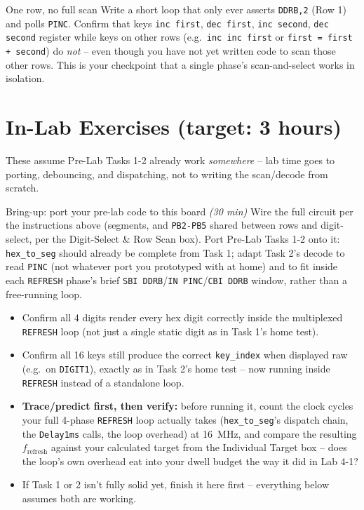 \documentclass[11pt]{article}
\begin{document}
\begin{tryit}{One row, no full scan}
Write a short loop that only ever asserts \texttt{DDRB,2} (Row 1) and polls
\texttt{PINC}. Confirm that keys \texttt{inc first}, \texttt{dec first},
\texttt{inc second}, \texttt{dec second} register while keys on other rows
(e.g.\ \texttt{inc inc first} or \texttt{first = first + second}) do \emph{not}
-- even though you have not yet written code to scan those other rows. This is
your checkpoint that a single phase's scan-and-select works in isolation.
\end{tryit}

\section*{In-Lab Exercises (target: 3 hours)}
These assume Pre-Lab Tasks 1-2 already work \emph{somewhere} -- lab time goes
to porting, debouncing, and dispatching, not to writing the scan/decode from
scratch.

\begin{labexercise}{Bring-up: port your pre-lab code to this board \hfill {\small \itshape (30 min)}}
Wire the full circuit per the instructions above (segments, and
\texttt{PB2-PB5} shared between rows and digit-select, per the Digit-Select \&
Row Scan box). Port Pre-Lab Tasks 1-2 onto it: \texttt{hex\_to\_seg} should
already be complete from Task 1; adapt Task 2's decode to read \texttt{PINC}
(not whatever port you prototyped with at home) and to fit inside each
\texttt{REFRESH} phase's brief \texttt{SBI DDRB}/\texttt{IN PINC}/\texttt{CBI
DDRB} window, rather than a free-running loop.
\begin{itemize}[nosep,leftmargin=*]
  \item Confirm all 4 digits render every hex digit correctly inside the
        multiplexed \texttt{REFRESH} loop (not just a single static digit as
        in Task 1's home test).
  \item Confirm all 16 keys still produce the correct \texttt{key\_index} when
        displayed raw (e.g.\ on \texttt{DIGIT1}), exactly as in Task 2's home
        test -- now running inside \texttt{REFRESH} instead of a standalone loop.
  \item \textbf{Trace/predict first, then verify:} before running it, count the
        clock cycles your full 4-phase \texttt{REFRESH} loop actually takes
        (\texttt{hex\_to\_seg}'s dispatch chain, the \texttt{Delay1ms} calls, the
        loop overhead) at 16~MHz, and compare the resulting $f_{\text{refresh}}$
        against your calculated target from the Individual Target box -- does
        the loop's own overhead eat into your dwell budget the way it did in
        Lab 4-1?
  \item If Task 1 or 2 isn't fully solid yet, finish it here first --
        everything below assumes both are working.
\end{itemize}
\end{labexercise}
\end{document}
